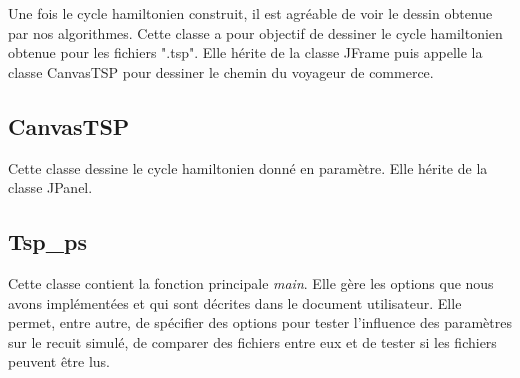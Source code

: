 \documentclass{article}
\begin{document}
Une fois le cycle hamiltonien construit, il est agréable de voir le dessin obtenue par nos algorithmes.
Cette classe a pour objectif de dessiner le cycle hamiltonien obtenue pour les fichiers ".tsp".
Elle hérite de la classe JFrame puis appelle la classe CanvasTSP pour dessiner le chemin du voyageur de commerce.

\subsection{CanvasTSP}

Cette classe dessine le cycle hamiltonien donné en paramètre.
Elle hérite de la classe JPanel.

\subsection{Tsp\_ps}

Cette classe contient la fonction principale \emph{main}.
Elle gère les options que nous avons implémentées et qui sont décrites dans le document utilisateur.
Elle permet, entre autre, de spécifier des options pour tester l'influence des paramètres sur le recuit simulé, de comparer des fichiers entre eux et de tester si les fichiers peuvent être lus.
\end{document}
